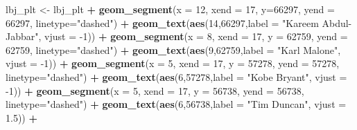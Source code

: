 \documentclass[]{book}
\newenvironment{Shaded}{\begin{snugshade}}{\end{snugshade}}
\newcommand{\DataTypeTok}[1]{\textcolor[rgb]{0.13,0.29,0.53}{#1}}
\newcommand{\DecValTok}[1]{\textcolor[rgb]{0.00,0.00,0.81}{#1}}
\newcommand{\FloatTok}[1]{\textcolor[rgb]{0.00,0.00,0.81}{#1}}
\newcommand{\KeywordTok}[1]{\textcolor[rgb]{0.13,0.29,0.53}{\textbf{#1}}}
\newcommand{\NormalTok}[1]{#1}
\newcommand{\OperatorTok}[1]{\textcolor[rgb]{0.81,0.36,0.00}{\textbf{#1}}}
\newcommand{\StringTok}[1]{\textcolor[rgb]{0.31,0.60,0.02}{#1}}
\begin{document}
\begin{Shaded}
\begin{Highlighting}[]
\NormalTok{lbj_plt <-}\StringTok{ }\NormalTok{lbj_plt }\OperatorTok{+}\StringTok{ }
\StringTok{  }\KeywordTok{geom_segment}\NormalTok{(}\DataTypeTok{x =} \DecValTok{12}\NormalTok{, }\DataTypeTok{xend =} \DecValTok{17}\NormalTok{, }\DataTypeTok{y=}\DecValTok{66297}\NormalTok{, }\DataTypeTok{yend =} \DecValTok{66297}\NormalTok{, }\DataTypeTok{linetype=}\StringTok{"dashed"}\NormalTok{) }\OperatorTok{+}\StringTok{ }
\StringTok{  }\KeywordTok{geom_text}\NormalTok{(}\KeywordTok{aes}\NormalTok{(}\DecValTok{14}\NormalTok{,}\DecValTok{66297}\NormalTok{,}\DataTypeTok{label =} \StringTok{"Kareem Abdul-Jabbar"}\NormalTok{, }\DataTypeTok{vjust =} \DecValTok{-1}\NormalTok{)) }\OperatorTok{+}\StringTok{ }
\StringTok{  }\KeywordTok{geom_segment}\NormalTok{(}\DataTypeTok{x =} \DecValTok{8}\NormalTok{, }\DataTypeTok{xend =} \DecValTok{17}\NormalTok{, }\DataTypeTok{y =} \DecValTok{62759}\NormalTok{, }\DataTypeTok{yend =} \DecValTok{62759}\NormalTok{, }\DataTypeTok{linetype=}\StringTok{"dashed"}\NormalTok{) }\OperatorTok{+}\StringTok{ }
\StringTok{  }\KeywordTok{geom_text}\NormalTok{(}\KeywordTok{aes}\NormalTok{(}\DecValTok{9}\NormalTok{,}\DecValTok{62759}\NormalTok{,}\DataTypeTok{label =} \StringTok{"Karl Malone"}\NormalTok{, }\DataTypeTok{vjust =} \DecValTok{-1}\NormalTok{)) }\OperatorTok{+}
\StringTok{  }\KeywordTok{geom_segment}\NormalTok{(}\DataTypeTok{x =} \DecValTok{5}\NormalTok{, }\DataTypeTok{xend =} \DecValTok{17}\NormalTok{, }\DataTypeTok{y =} \DecValTok{57278}\NormalTok{, }\DataTypeTok{yend =} \DecValTok{57278}\NormalTok{, }\DataTypeTok{linetype=}\StringTok{"dashed"}\NormalTok{) }\OperatorTok{+}\StringTok{ }
\StringTok{  }\KeywordTok{geom_text}\NormalTok{(}\KeywordTok{aes}\NormalTok{(}\DecValTok{6}\NormalTok{,}\DecValTok{57278}\NormalTok{,}\DataTypeTok{label =} \StringTok{"Kobe Bryant"}\NormalTok{, }\DataTypeTok{vjust =} \DecValTok{-1}\NormalTok{)) }\OperatorTok{+}
\StringTok{  }\KeywordTok{geom_segment}\NormalTok{(}\DataTypeTok{x =} \DecValTok{5}\NormalTok{, }\DataTypeTok{xend =} \DecValTok{17}\NormalTok{, }\DataTypeTok{y =} \DecValTok{56738}\NormalTok{, }\DataTypeTok{yend =} \DecValTok{56738}\NormalTok{, }\DataTypeTok{linetype=}\StringTok{"dashed"}\NormalTok{) }\OperatorTok{+}\StringTok{ }
\StringTok{  }\KeywordTok{geom_text}\NormalTok{(}\KeywordTok{aes}\NormalTok{(}\DecValTok{6}\NormalTok{,}\DecValTok{56738}\NormalTok{,}\DataTypeTok{label =} \StringTok{"Tim Duncan"}\NormalTok{, }\DataTypeTok{vjust =} \FloatTok{1.5}\NormalTok{)) }\OperatorTok{+}

\end{Highlighting}
\end{Shaded}
\end{document}
